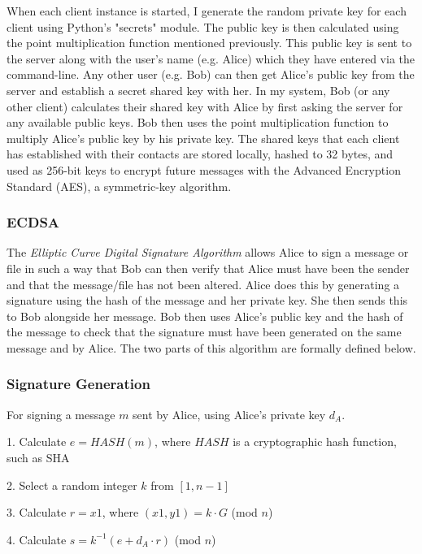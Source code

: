 \documentclass[12pt,a4paper]{article}
\begin{document}
When each client instance is started, I generate the random private key for each client using Python's "secrets" module. 
The public key is then calculated using the point multiplication function mentioned previously. 
This public key is sent to the server along with the user's name (e.g. Alice) which they have entered via the command-line. 
Any other user (e.g. Bob) can then get Alice's public key from the server and establish a secret shared key with her. 
In my system, Bob (or any other client) calculates their shared key with Alice by first asking the server 
for any available public keys. 
Bob then uses the point multiplication function to multiply Alice's public key by his private key. 
The shared keys that each client has established with their contacts are stored locally, 
hashed to 32 bytes, and used as 256-bit keys to encrypt future messages with the Advanced Encryption Standard (AES), a symmetric-key algorithm. 

\subsubsection{ECDSA} \noindent \label{ECDSA}
The \emph{Elliptic Curve Digital Signature Algorithm} allows Alice to sign a message or file in such a way that Bob can then 
verify that Alice must have been the sender and that the message/file has not been altered. 
Alice does this by generating a signature using the hash of the message and her private key. 
She then sends this to Bob alongside her message. 
Bob then uses Alice's public key and the hash of the message to check that the signature must have been generated on the same message and by Alice. 
The two parts of this algorithm are formally defined below. 

\subsubsection{Signature Generation} \noindent \label{Signature Generation}
For signing a message $m$ sent by Alice, using Alice's private key $d_A$.

\vspace{1mm}

1. \space Calculate $e = HASH(m)$, where $HASH$ is a cryptographic hash function, such as SHA

2. \space Select a random integer $k$ from $[1,n-1]$

3. \space Calculate $r = x1$, where $(x1,y1) = k \cdot G$ (mod $n$)

4. \space Calculate $s = k^{-1}(e+d_A \cdot r)$ (mod $n$)
\end{document}
